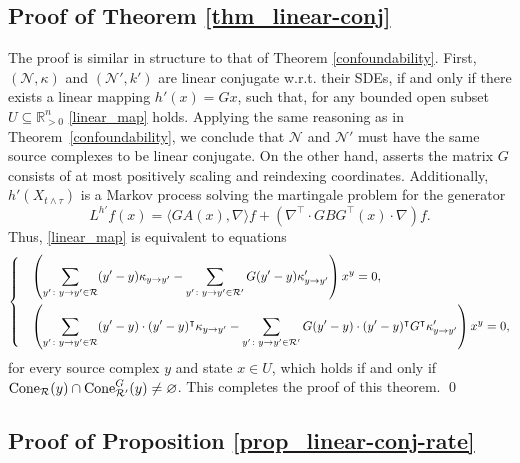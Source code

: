 \documentclass[10pt,a4paper]{amsart}
\let\emptyset\varnothing
\theoremstyle{definition}
\theoremstyle{remark}
\theoremstyle{consequence}
\def\k{\kappa}
\def\cN{\mathcal{N}}
\def\cR{\mathcal{R}}
\def\R{\mathbb{R}}
\numberwithin{equation}{section}
\begin{document}
\subsection{Proof of Theorem \ref{thm_linear-conj}} \label{prf_linear-conj}
The proof is similar in structure to that of Theorem \ref{confoundability}.
First, $(\cN, \k)$ and $(\cN', k')$ are linear conjugate w.r.t. their SDEs, if and only if there exists a linear mapping $h' (x) = G x$, such that, for any bounded open subset $U \subseteq \R_{>0}^n$ \eqref{linear_map} holds. Applying the same reasoning as in Theorem~\ref{confoundability}, we conclude that $\cN$ and $\cN'$ must have the same source complexes to be linear conjugate. On the other hand, \cite[Lemma 3.1]{johnston2011linear} asserts the matrix $G$ consists of at most positively scaling and reindexing coordinates. Additionally, $h' (X_{t \wedge \tau})$ is a Markov process solving the martingale problem for the generator
\begin{equation*}
    L^{h'} f(x) = \langle G A(x), \nabla \rangle f + (\nabla^{\intercal} \cdot G B G^{\intercal} (x) \cdot \nabla) f .
\end{equation*}
Thus, \eqref{linear_map} is equivalent to equations 
\begin{equation*}
    \begin{dcases}
     &  \left(\sum\limits_{y' \colon y\to y'\in \cR}(y' - y) \k_{y\to y'} - \sum\limits_{y' \colon y\to y'\in \cR'}G(y' - y)\k'_{y\to y'} \right) x^y = 0, \\
     & \left(\sum\limits_{y' \colon y\to y'\in \cR}  (y' - y)\cdot(y' - y)^{\intercal}  \k_{y\to y'}-\sum\limits_{y' \colon y\to y'\in \cR'}G(y' - y)\cdot(y' - y)^{\intercal}G^{\intercal} \k'_{y\to y'} \right) x^y = 0,
\end{dcases}
\end{equation*}
for every source complex $y$ and state $x \in U$, which holds if and only if $
    {\rm Cone}_{\cR} (y) \cap  {\rm Cone}^{G}_{\cR'} (y) \neq \emptyset$. This completes the proof of this theorem.
\qed

\subsection{Proof of Proposition \ref{prop_linear-conj-rate}}\label{prf_linear-conj-rate}
\end{document}
